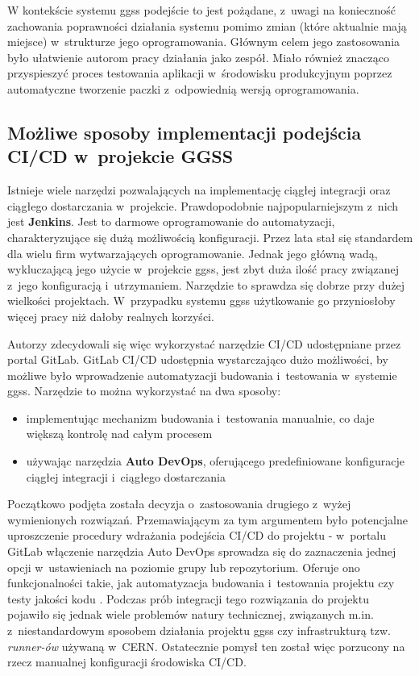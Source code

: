 W kontekście systemu \gls*{ggss} podejście to jest pożądane, z~uwagi na konieczność zachowania poprawności działania systemu pomimo zmian (które aktualnie mają miejsce) w~strukturze jego oprogramowania. Głównym celem jego zastosowania było ułatwienie autorom pracy działania jako zespół. Miało również znacząco przyspieszyć proces testowania aplikacji w~środowisku produkcyjnym poprzez automatyczne tworzenie paczki z~odpowiednią wersją oprogramowania.

\subsection{Możliwe sposoby implementacji podejścia CI/CD w~projekcie GGSS}
Istnieje wiele narzędzi pozwalających na implementację ciągłej integracji oraz ciągłego dostarczania w~projekcie. Prawdopodobnie najpopularniejszym z~nich jest \textbf{Jenkins}. Jest to darmowe \cite{JenkinsWiki} oprogramowanie do automatyzacji, charakteryzujące się dużą możliwością konfiguracji. Przez lata stał się standardem dla wielu firm wytwarzających oprogramowanie. Jednak jego główną wadą, wykluczającą jego użycie w~projekcie \gls*{ggss}, jest zbyt duża ilość pracy związanej z~jego konfiguracją i~utrzymaniem. Narzędzie to sprawdza się dobrze przy dużej wielkości projektach. W~przypadku systemu \gls*{ggss} użytkowanie go przyniosłoby więcej pracy niż dałoby realnych korzyści. 

Autorzy zdecydowali się więc wykorzystać narzędzie CI/CD udostępniane przez portal GitLab. GitLab CI/CD udostępnia wystarczająco dużo możliwości, by możliwe było wprowadzenie automatyzacji budowania i~testowania w~systemie \gls*{ggss}. Narzędzie to można wykorzystać na dwa sposoby:
\begin{itemize}
\item implementując mechanizm budowania i~testowania manualnie, co daje większą kontrolę nad całym procesem
\item używając narzędzia \textbf{Auto DevOps}, oferującego predefiniowane konfiguracje ciągłej integracji i~ciągłego dostarczania
\end{itemize}
Początkowo podjęta została decyzja o~zastosowania drugiego z~wyżej wymienionych rozwiązań. Przemawiającym za tym argumentem było potencjalne uproszczenie procedury wdrażania podejścia CI/CD do projektu - w~portalu GitLab włączenie narzędzia Auto DevOps sprowadza się do zaznaczenia jednej opcji w~ustawieniach na poziomie grupy lub repozytorium. Oferuje ono funkcjonalności takie, jak automatyzacja budowania i~testowania projektu czy testy jakości kodu \cite{AutoDevOpsPage}. Podczas prób integracji tego rozwiązania do projektu pojawiło się jednak wiele problemów natury technicznej, związanych m.in. z~niestandardowym sposobem działania projektu \gls*{ggss} czy infrastrukturą tzw. \textit{runner-ów} używaną w~CERN. Ostatecznie pomysł ten został więc porzucony na rzecz manualnej konfiguracji środowiska CI/CD. 

